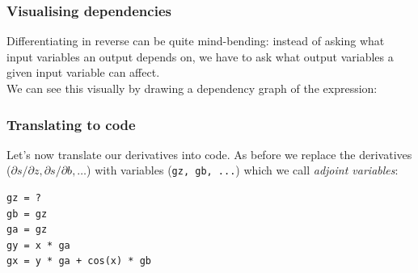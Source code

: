 \documentclass[]{article}
\begin{document}
\begin{frame}
\frametitle{Visualising dependencies}

Differentiating in reverse can be quite mind-bending: instead of asking what input variables an output depends on, we have to ask what output variables a given input variable can affect.
\\[1em]
We can see this visually by drawing a dependency graph of the expression: \\[1em]
\begin{center}
\end{center}

\end{frame}

\begin{frame}[fragile]
\frametitle{Translating to code}

Let's now translate our derivatives into code. As before we replace the derivatives ($\partial s/\partial z, \partial s/\partial b, \dots$) with variables (\lstinline!gz, gb, ...!) which we call \emph{adjoint variables}:

\begin{lstlisting}
gz = ?
gb = gz
ga = gz
gy = x * ga
gx = y * ga + cos(x) * gb
\end{lstlisting}


\end{frame}
\end{document}
